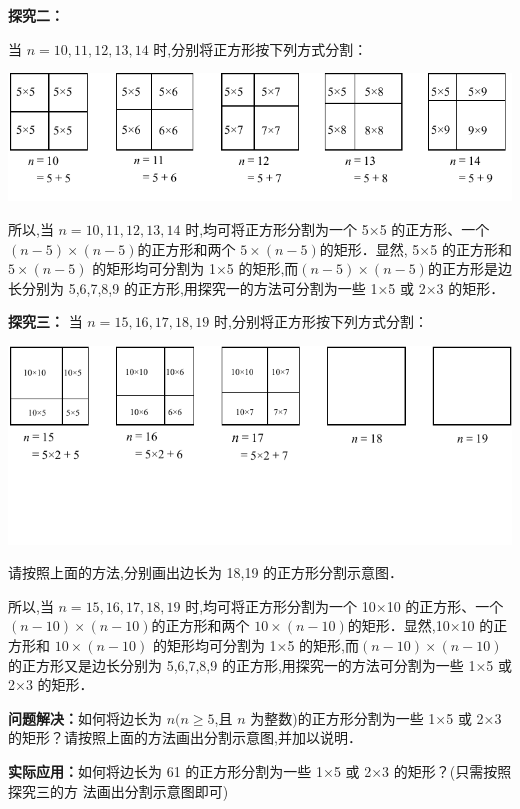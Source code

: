 \documentclass[10pt,a4paper]{ctexart}
\begin{document}
	\textbf{探究二：}
	
	当 $ n=10,11,12,13,14 $ 时,分别将正方形按下列方式分割：
	
	\begin{center}
		\includegraphics[width=0.9\linewidth]{23/2016b}
	\end{center}
	
	所以,当 $ n=10,11,12,13,14 $ 时,均可将正方形分割为一个 5×5 的正方形、一个
	$ (n-5)×(n-5) $的正方形和两个 $ 5×(n-5) $的矩形．显然, 5×5 的正方形和 $ 5×(n-5) $
	的矩形均可分割为 1×5 的矩形,而$ (n-5)×(n-5) $的正方形是边长分别为 5,6,7,8,9
	的正方形,用探究一的方法可分割为一些 1×5 或 2×3 的矩形．
	
	\textbf{探究三：}
	当 $ n=15,16,17,18,19 $ 时,分别将正方形按下列方式分割：
	
	\begin{center}
		\includegraphics[width=0.9\linewidth]{23/2016c}
	\end{center}
	
	请按照上面的方法,分别画出边长为 18,19 的正方形分割示意图．
	
	所以,当 $ n=15,16,17,18,19 $ 时,均可将正方形分割为一个 10×10 的正方形、一个
	$ (n-10)×(n-10) $的正方形和两个 $ 10×(n-10) $的矩形．显然,10×10 的正方形和 $ 10×(n-10) $
	的矩形均可分割为 1×5 的矩形,而$ (n-10)×(n-10) $的正方形又是边长分别为 5,6,7,8,9 的正方形,用探究一的方法可分割为一些 1×5 或 2×3 的矩形．
	
	\textbf{问题解决：}如何将边长为 $ n(n\geq 5 $,且 $ n $ 为整数)的正方形分割为一些 1×5 或 2×3 的矩形？请按照上面的方法画出分割示意图,并加以说明．
	
	\rule{0em}{5em}
	
	\textbf{实际应用：}如何将边长为 61 的正方形分割为一些 1×5 或 2×3 的矩形？(只需按照探究三的方
	法画出分割示意图即可)
	
\end{document}
